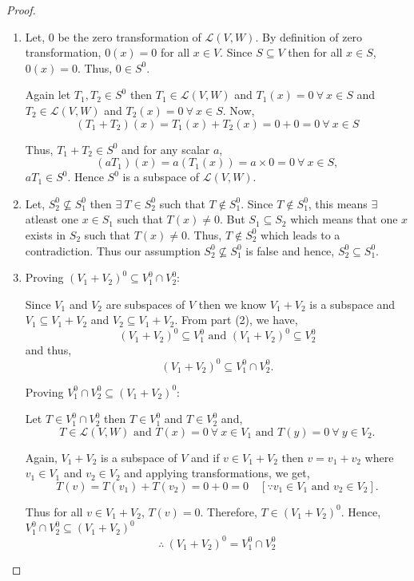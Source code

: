 \documentclass[12pt, a4paper]{article}
\theoremstyle{definition}
\theoremstyle{remark}
\newcommand{\LL}{\mathscr{L}}
\begin{document}
\begin{proof}
    \begin{enumerate}
        \item Let, $0$ be the zero transformation of $\LL(V,W)$. By definition of zero transformation, $0(x) = 0$ for all $x \in V$. Since $S \subseteq V$ then for all $x \in S$, $0(x) = 0$. Thus, $0 \in S^0$.

        Again let $T_1, T_2 \in S^0$ then $T_1 \in \LL(V,W)$ and $T_1(x) = 0 \ \forall \ x \in S$ and $T_2 \in \LL(V,W)$ and $T_2(x) = 0 \ \forall \ x \in S$. Now,
        $$(T_1 + T_2)(x) = T_1(x) + T_2(x) = 0 + 0 = 0 \ \forall \ x \in S$$

        Thus, $T_1 + T_2 \in S^0$ and for any scalar $a$,
        $$(a T_1)(x) = a(T_1(x)) = a \times 0 = 0 \ \forall \ x \in S,$$
        $a T_1 \in S^0$. Hence $S^0$ is a subspace of $\LL(V,W)$.

        \item Let, $S_2^0 \not\subseteq S_1^0$ then $\exists \ T \in S_2^0$ such that $T \not\in S_1^0$. Since $T \not\in S_1^0$, this means $\exists$ atleast one $x \in S_1$ such that $T(x) \neq 0$. But $S_1 \subseteq S_2$ which means that one $x$ exists in $S_2$ such that $T(x) \neq 0$. Thus, $T \not\in S_2^0$ which leads to a contradiction. Thus our assumption $S_2^0 \not\subseteq S_1^0$ is false and hence, $S_2^0 \subseteq S_1^0$.
        
        \item Proving $(V_1 + V_2)^0 \subseteq V_1^0 \cap V_2^0$:

        Since $V_1$ and $V_2$ are subspaces of $V$ then we know $V_1 + V_2$ is a subspace and $V_1 \subseteq V_1 + V_2$ and $V_2 \subseteq V_1 + V_2$. From part (2), we have,
        $$(V_1 + V_2)^0 \subseteq V_1^0 \text{ and } (V_1 + V_2)^0 \subseteq V_2^0$$
        and thus,
        $$(V_1 + V_2)^0 \subseteq V_1^0 \cap V_2^0.$$

        Proving $V_1^0 \cap V_2^0 \subseteq (V_1 + V_2)^0$:

        Let $T \in V_1^0 \cap V_2^0$ then $T \in V_1^0$ and $T \in V_2^0$ and,
        $$T \in \LL(V,W) \text{ and } T(x) = 0 \ \forall \ x \in V_1 \text{ and } T(y) = 0 \ \forall \ y \in V_2.$$

        Again, $V_1 + V_2$ is a subspace of $V$ and if $v \in V_1 + V_2$ then $v = v_1 + v_2$ where $v_1 \in V_1$ and $v_2 \in V_2$ and applying transformations, we get,
        $$T(v) = T(v_1) + T(v_2) = 0 + 0 = 0 \quad [\because v_1 \in V_1 \text{ and } v_2 \in V_2].$$

        Thus for all $v \in V_1 + V_2$, $T(v) = 0$. Therefore, $T \in (V_1 + V_2)^0$.
        Hence, $V_1^0 \cap V_2^0 \subseteq (V_1 + V_2)^0$
        $$\therefore \ (V_1 + V_2)^0 = V_1^0 \cap V_2^0$$
    \end{enumerate}
\end{proof}
\end{document}
